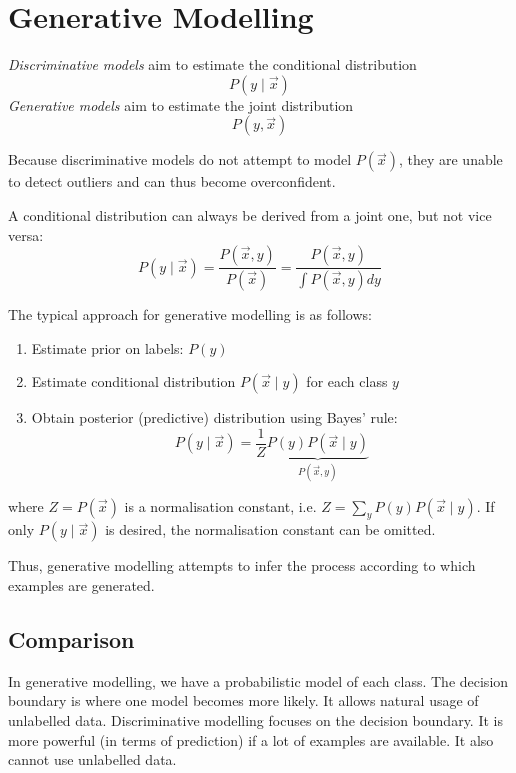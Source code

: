 \section{Generative Modelling}
\emph{Discriminative models} aim to estimate
the conditional distribution
\begin{equation*}
    P(y \mid \vec{x})
\end{equation*}
\emph{Generative models} aim to estimate
the joint distribution
\begin{equation*}
    P(y, \vec{x})
\end{equation*}

Because discriminative models do not attempt
to model $P(\vec{x})$,
they are unable to detect outliers
and can thus become overconfident.

A conditional distribution can always be
derived from a joint one, but not vice versa:
\begin{equation*}
    P(y \mid \vec{x})
    = \frac{P(\vec{x}, y)}{P(\vec{x})}
    = \frac{P(\vec{x}, y)}{
        \int{P(\vec{x}, y) dy}
    }
\end{equation*}

The typical approach for generative
modelling is as follows:
\begin{enumerate}
    \item Estimate prior on labels: $P(y)$
    \item Estimate conditional distribution
    $P(\vec{x} \mid y)$ for each class $y$
    \item Obtain posterior (predictive) distribution
    using Bayes' rule:
    \begin{equation*}
        P(y \mid \vec{x}) =
        \frac{1}{Z} 
        \underbrace{P(y) P(\vec{x} \mid y)}_{P(\vec{x}, y)}
    \end{equation*}
\end{enumerate}
where $Z = P(\vec{x})$ is a normalisation
constant,
i.e. $Z = \sum_y{P(y) P(\vec{x} \mid y)}$.
If only $P(y \mid \vec{x})$ is desired,
the normalisation constant can be omitted.

Thus, generative modelling attempts to
infer the process according to which
examples are generated.

\subsection{Comparison}
In generative modelling, we have a
probabilistic model of each class.
The decision boundary is where one
model becomes more likely.
It allows natural usage of unlabelled data.
Discriminative modelling focuses
on the decision boundary.
It is more powerful (in terms of prediction)
if a lot of examples are available.
It also cannot use unlabelled data.

